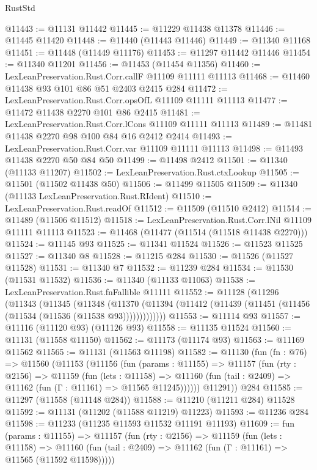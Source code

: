 \begin{lexlean}{RustStd}
\begin{coremodule}
@11443 := @11131 @11442
@11445 := @11229 @11438 @11378
@11446 := @11445 @11420
@11448 := @11440 (@11443 @11446)
@11449 := @11340 @11168
@11451 := @11448 (@11449 @11176)
@11453 := @11297 @11442 @11446
@11454 := @11340 @11201
@11456 := @11453 (@11454 @11356)
@11460 := LexLeanPreservation.Rust.Corr.callF @11109 @11111 @11113
@11468 := @11460 @11438 @93 @101 @86 @51 @2403 @2415 @284
@11472 := LexLeanPreservation.Rust.Corr.opsOfL @11109 @11111 @11113
@11477 := @11472 @11438 @2270 @101 @86 @2415
@11481 := LexLeanPreservation.Rust.Corr.lCons @11109 @11111 @11113
@11489 := @11481 @11438 @2270 @98 @100 @84 @16 @2412 @2414
@11493 := LexLeanPreservation.Rust.Corr.var @11109 @11111 @11113
@11498 := @11493 @11438 @2270 @50 @84 @50
@11499 := @11498 @2412
@11501 := @11340 (@11133 @11207)
@11502 := LexLeanPreservation.Rust.ctxLookup
@11505 := @11501 (@11502 @11438 @50)
@11506 := @11499 @11505
@11509 := @11340 (@11133 LexLeanPreservation.Rust.RIdent)
@11510 := LexLeanPreservation.Rust.readOf
@11512 := @11509 (@11510 @2412)
@11514 := @11489 (@11506 @11512)
@11518 := LexLeanPreservation.Rust.Corr.lNil @11109 @11111 @11113
@11523 := @11468 (@11477 (@11514 (@11518 @11438 @2270)))
@11524 := @11145 @93
@11525 := @11341 @11524
@11526 := @11523 @11525
@11527 := @11340 @8
@11528 := @11215 @284
@11530 := @11526 (@11527 @11528)
@11531 := @11340 @7
@11532 := @11239 @284
@11534 := @11530 (@11531 @11532)
@11536 := @11340 (@11133 @11063)
@11538 := LexLeanPreservation.Rust.fnFallible @11111
@11552 := @11128
    (@11296
      (@11343
        (@11345
          (@11348
            (@11370 (@11394 (@11412 (@11439 (@11451 (@11456 (@11534 (@11536 (@11538 @93)))))))))))))
@11553 := @11114 @93
@11557 := @11116 (@11120 @93) (@11126 @93)
@11558 := @11135 @11524
@11560 := @11131 (@11558 @11150)
@11562 := @11173 (@11174 @93)
@11563 := @11169 @11562
@11565 := @11131 (@11563 @11198)
@11582 := @11130
    (fun (fn : @76) =>
    @11560
      (@11153
        (@11156
          (fun (params : @11155) =>
          @11157
            (fun (rty : @2156) =>
            @11159
              (fun (lets : @11158) =>
              @11160 (fun (tail : @2409) => @11162 (fun (Γ : @11161) => @11565 @11245))))))
        @11291))
    @284
@11585 := @11297 (@11558 (@11148 @284))
@11588 := @11210 (@11211 @284) @11528
@11592 := @11131 (@11202 (@11588 @11219) @11223)
@11593 := @11236 @284
@11598 := @11233 (@11235 @11593 @11532 @11191 @11193)
@11609 := fun (params : @11155) =>
  @11157
    (fun (rty : @2156) =>
    @11159
      (fun (lets : @11158) =>
      @11160 (fun (tail : @2409) => @11162 (fun (Γ : @11161) => @11565 (@11592 @11598)))))

\end{coremodule}
\end{lexlean}
